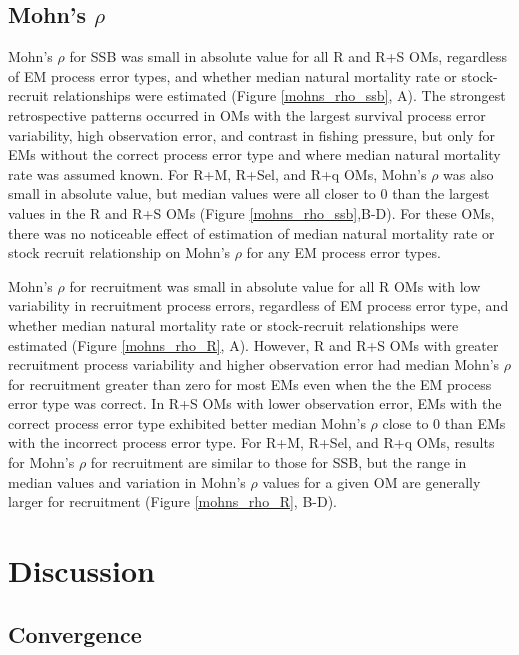 \documentclass[
  12pt,
]{article}
\begin{document}
\hypertarget{mohns-rho-1}{%
\subsection*{\texorpdfstring{Mohn's
\(\rho\)}{Mohn's \textbackslash rho}}\label{mohns-rho-1}}

Mohn's \(\rho\) for SSB was small in absolute value for all R and R+S
OMs, regardless of EM process error types, and whether median natural
mortality rate or stock-recruit relationships were estimated (Figure
\ref{mohns_rho_ssb}, A). The strongest retrospective patterns occurred
in OMs with the largest survival process error variability, high
observation error, and contrast in fishing pressure, but only for EMs
without the correct process error type and where median natural
mortality rate was assumed known. For R+M, R+Sel, and R+q OMs, Mohn's
\(\rho\) was also small in absolute value, but median values were all
closer to 0 than the largest values in the R and R+S OMs (Figure
\ref{mohns_rho_ssb},B-D). For these OMs, there was no noticeable effect
of estimation of median natural mortality rate or stock recruit
relationship on Mohn's \(\rho\) for any EM process error types.

Mohn's \(\rho\) for recruitment was small in absolute value for all R
OMs with low variability in recruitment process errors, regardless of EM
process error type, and whether median natural mortality rate or
stock-recruit relationships were estimated (Figure \ref{mohns_rho_R},
A). However, R and R+S OMs with greater recruitment process variability
and higher observation error had median Mohn's \(\rho\) for recruitment
greater than zero for most EMs even when the the EM process error type
was correct. In R+S OMs with lower observation error, EMs with the
correct process error type exhibited better median Mohn's \(\rho\) close
to 0 than EMs with the incorrect process error type. For R+M, R+Sel, and
R+q OMs, results for Mohn's \(\rho\) for recruitment are similar to
those for SSB, but the range in median values and variation in Mohn's
\(\rho\) values for a given OM are generally larger for recruitment
(Figure \ref{mohns_rho_R}, B-D).

\hypertarget{discussion}{%
\section*{Discussion}\label{discussion}}

\hypertarget{convergence}{%
\subsection*{Convergence}\label{convergence}}
\end{document}
